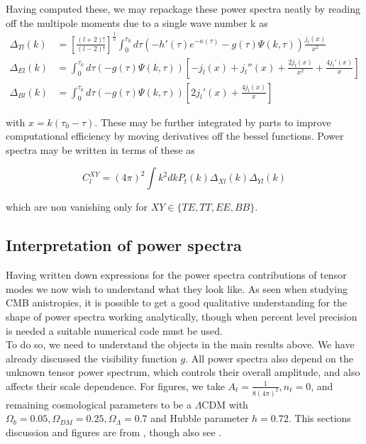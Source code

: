 \documentclass[a4paper,10pt]{article}
\newcommand{\half}{\frac{1}{2}}
\newcommand{\ltwo}{\left[\frac{(l+2)!}{(l-2)!}\right]}
\begin{document}
Having computed these, we may repackage these power spectra neatly by reading off the multipole moments due to a single wave number k as 
\begin{equation}
\begin{split}
\Delta_{Tl}(k) &= \ltwo^\half \int_0^{\tau_0} d\tau \left(-h'(\tau)e^{-\kappa(\tau)}-g(\tau)\Psi(k,\tau)\right)\frac{j_l(x)}{x^2}\\
\Delta_{El}(k) &= \int_0^{\tau_0}d\tau  \left(-g(\tau)\Psi(k,\tau)\right)\left[-j_l(x) +j_l''(x)+\frac{2j_l(x)}{x^2} + \frac{4j_l'(x)}{x}\right]\\
\Delta_{Bl}(k) &= \int_0^{\tau_0} d\tau \left(-g(\tau)\Psi(k,\tau)\right)\left[2j_l'(x)+\frac{4j_l(x)}{x}\right]
\end{split}
\end{equation}
 
with $x=k(\tau_0-\tau)$. These may be further integrated by parts to improve computational efficiency by moving derivatives off the bessel functions. Power spectra may be written in terms of these as 

\begin{equation}
C_l^{XY} = (4\pi)^2 \int k^2 dk P_t(k) \Delta_{Xl}(k)\Delta_{Yl}(k)
\end{equation}

which are non vanishing only for $XY \in \{TE, TT, EE, BB\}$. 

\subsection{Interpretation of power spectra}
\label{interpretation}

Having written down expressions for the power spectra contributions of tensor modes we now wish to understand what they look like. As seen when studying CMB anistropies, it is possible to get a good qualitative understanding for the shape of power spectra working analytically, though when percent level precision is needed a suitable numerical code must be used.\\

To do so, we need to understand the objects in the main results above. We have already discussed the visibility function $g$. All power spectra also depend on the unknown tensor power spectrum, which controls their overall amplitude, and also affects their scale dependence. For figures, we take  $A_t = \frac{1}{8(4\pi)^2}, n_t=0$, and remaining cosmological parameters to be a $\Lambda$CDM with $\Omega_b=0.05, \Omega_{DM}=0.25, \Omega_\Lambda=0.7$ and Hubble parameter $h=0.72$. This sections discussion and figures are from \cite{Pritchard}, though also see \cite{zhao}.\\
\end{document}
